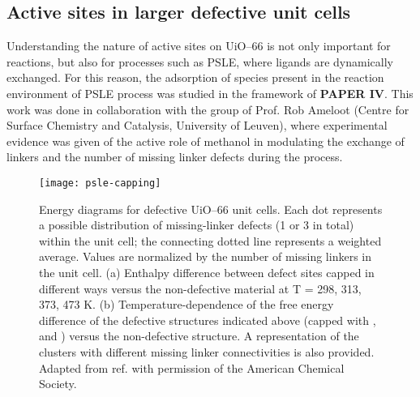 \subsection*{Active sites in larger defective unit cells}
Understanding the nature of active sites on UiO--66 is not only important for reactions, but also for processes such as PSLE, where ligands are dynamically exchanged. For this reason, the adsorption of species present in the reaction environment of PSLE process was studied in the framework of \textbf{PAPER IV}. This work was done in collaboration with the group of Prof. Rob Ameloot (Centre for Surface Chemistry and Catalysis, University of Leuven), where experimental evidence was given of the active role of methanol in modulating the exchange of linkers and the number of missing linker defects during the process. 
\npar
\begin{figure}[H]
	\centering
	\texttt{[image: psle-capping]}
	\caption{Energy diagrams for defective UiO--66 unit cells. Each dot represents a possible distribution of missing-linker defects (1 or 3 in total) within the unit cell; the connecting dotted line represents a weighted average. Values are normalized by the number of missing linkers in the unit cell. (a) Enthalpy difference between defect sites capped in different ways versus the non-defective material at T = 298, 313, 373, 473 K. (b) Temperature-dependence of the free energy difference of the defective structures indicated above (capped with ,  and ) versus the non-defective structure. A representation of the clusters with different missing linker connectivities is also provided. Adapted from ref. \cite{marreiros2019active} with permission of the American Chemical Society.}
	\label{fig:psle-capping}
\end{figure}
